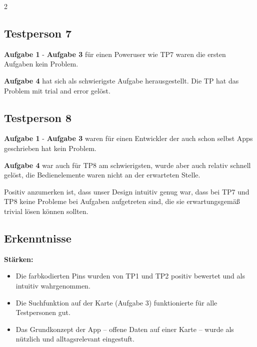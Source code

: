 \begin{multicols}{2}
\subsection*{Testperson 7}

\textbf{Aufgabe 1} - \textbf{Aufgabe 3} für einen Poweruser wie TP7 waren die ersten Aufgaben kein Problem. 

\textbf{Aufgabe 4} hat sich als schwierigste Aufgabe herausgestellt. Die TP hat das Problem mit trial and error gelöst.

\subsection*{Testperson 8}

\textbf{Aufgabe 1} - \textbf{Aufgabe 3} waren für einen Entwickler der auch schon selbst Apps geschrieben hat kein Problem. 

\textbf{Aufgabe 4} war auch für TP8 am schwierigsten, wurde aber auch relativ schnell gelöst, die Bedienelemente waren nicht an der erwarteten Stelle.

Positiv anzumerken ist, dass unser Design intuitiv genug war, dass bei TP7 und TP8 keine Probleme bei Aufgaben aufgetreten sind, die sie erwartungsgemäß trivial lösen können sollten.

\subsection{Erkenntnisse}

\textbf{Stärken:}
\begin{itemize}
  \item Die farbkodierten Pins wurden von TP1 und TP2 positiv
        bewertet und als intuitiv wahrgenommen.
  \item Die Suchfunktion auf der Karte (Aufgabe 3) funktionierte für
        alle Testpersonen gut.
  \item Das Grundkonzept der App – offene Daten auf einer Karte – wurde
        als nützlich und alltagsrelevant eingestuft.
\end{itemize}


\end{multicols}
